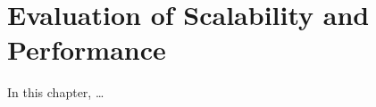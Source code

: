\chapter{Evaluation of Scalability and Performance}
\label{chap:evaluation}

In this chapter, \ldots











